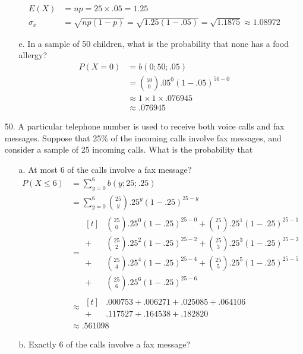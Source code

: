 \documentclass[letterpaper,12pt]{article}
\newcommand{\bp}[3]{%
  \binom{#2}{#1}#3^{#1}(1 - #3)^{#2 - #1}%
}
\begin{document}
\begin{enumerate}
\begin{enumerate}
        \begin{align*}
          E(X) &= np = 25 \times .05 = 1.25 \\
          \sigma_x &= \sqrt{np(1 - p)} = \sqrt{1.25(1 - .05)} = \sqrt{1.1875} \approx 1.08972
        \end{align*}
      \item[e.]
        In a sample of 50 children, what is the probability that none has a food allergy?
        \begin{align*}
          P(X = 0) &= b(0; 50; .05) \\\
          &= \bp{0}{50}{.05} \\
          &\approx 1 \times 1 \times .076945 \\
          &\approx .076945
        \end{align*}
    \end{enumerate}
  \item[50.]
    A particular telephone number is used to receive both voice calls and fax messages. Suppose that 25\% of the incoming calls involve fax messages, and consider a sample of 25 incoming calls. What is the probability that
    \begin{enumerate}
      \item[a.]
        At most 6 of the calls involve a fax message?
        \begin{align*}
          P(X \le 6) &= \sum_{y = 0}^6 b(y; 25; .25) \\
          &= \sum_{y = 0}^6 \bp{y}{25}{.25} \\
          &= \begin{aligned}[t]
              &\bp{0}{25}{.25} + \bp{1}{25}{.25} \\
            + &\bp{2}{25}{.25} + \bp{3}{25}{.25} \\
            + &\bp{4}{25}{.25} + \bp{5}{25}{.25} \\
            + &\bp{6}{25}{.25}
          \end{aligned} \\
          &\approx \begin{aligned}[t]
              &.000753 + .006271 + .025085 + .064106 \\
            + &.117527 + .164538 + .182820
          \end{aligned} \\
          &\approx .561098
        \end{align*}
      \item[b.]
        Exactly 6 of the calls involve a fax message?

\end{enumerate}
\end{enumerate}
\end{document}
